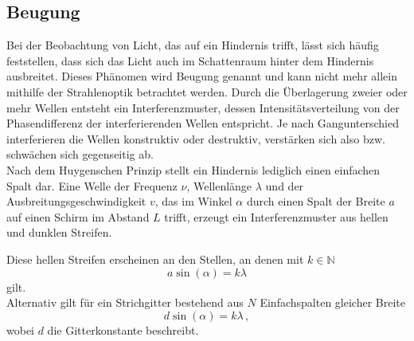 \subsection*{Beugung}

Bei der Beobachtung von Licht, das auf ein Hindernis trifft, lässt sich häufig feststellen, dass sich das Licht auch im Schattenraum hinter dem Hindernis ausbreitet.
Dieses Phänomen wird Beugung genannt und kann nicht mehr allein mithilfe der Strahlenoptik betrachtet werden.
Durch die Überlagerung zweier oder mehr Wellen entsteht ein Interferenzmuster, dessen Intensitätsverteilung von der Phasendifferenz der interferierenden Wellen entspricht.
Je nach Gangunterschied interferieren die Wellen konstruktiv oder destruktiv, verstärken sich also bzw. schwächen sich gegenseitig ab. \\

Nach dem Huygenschen Prinzip stellt ein Hindernis lediglich einen einfachen Spalt dar. 
Eine Welle der Frequenz $\nu$, Wellenlänge $\lambda$ und der Ausbreitungsgeschwindigkeit $v$, das im Winkel $\alpha$ durch einen Spalt der Breite $a$ auf einen Schirm im Abstand $L$ trifft, erzeugt ein Interferenzmuster
aus hellen und dunklen Streifen.

Diese hellen Streifen erscheinen an den Stellen, an denen mit $k \in \mathbb{N}$
\begin{equation}
    a \sin(\alpha) = k \lambda
    \label{eq:beugmaxeinzspalt}
\end{equation}
gilt. \\

Alternativ gilt für ein Strichgitter bestehend aus $N$ Einfachspalten gleicher Breite
\begin{equation}
    d \sin(\alpha) = k \lambda \,,
    \label{eq:beugmaxgitter}
\end{equation}
wobei $d$ die Gitterkonstante beschreibt.



